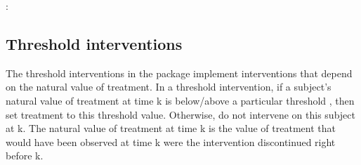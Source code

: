 \documentclass[letterpaper,10pt,english]{sphinxmanual}
\begin{document}
\begin{sphinxVerbatim}[commandchars=\\\{\}]
  \PYG{p}{[}\PYG{p}{]}

  
  

        
        
        
      \PYG{p}{[} \PYG{p}{[}      \PYG{p}{]}\PYG{p}{]}
      
\end{sphinxVerbatim}

\sphinxAtStartPar
{}:
\begin{quote}

\end{quote}


\subsection{Threshold interventions}
\label{\detokenize{Specifications/Intervention:threshold-interventions}}
\sphinxAtStartPar
The threshold interventions in the package implement interventions that depend on the natural value of treatment.
In a threshold intervention, if a subject’s natural value of treatment at time k is below/above a particular threshold
, then set treatment to this threshold value. Otherwise, do not intervene on this subject at k.
The natural value of treatment at time k is the value of treatment that would have been observed at
time k were the intervention discontinued right before k.
\end{document}
